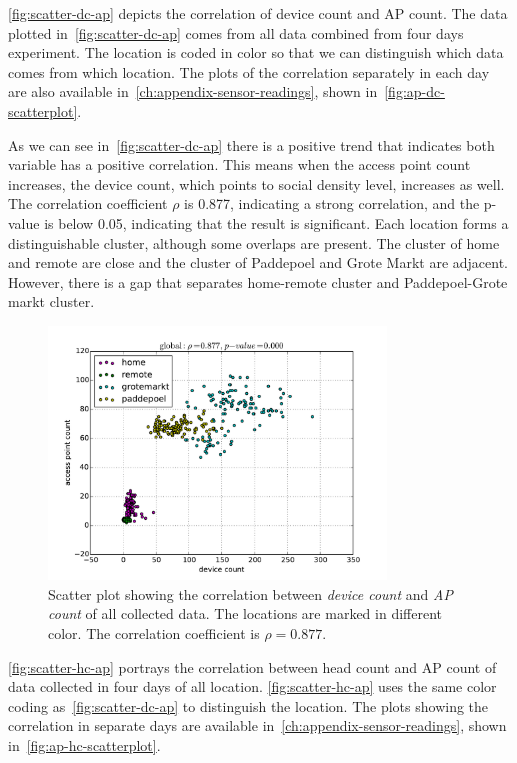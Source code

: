 	\autoref{fig:scatter-dc-ap} depicts the correlation of device count and \ac{AP} count. The data plotted in~\autoref{fig:scatter-dc-ap} comes from all data combined from four days experiment. The location is coded in color so that we can distinguish which data comes from which location. The plots of the correlation separately in each day are also available in~\autoref{ch:appendix-sensor-readings}, shown in~\autoref{fig:ap-dc-scatterplot}.
	
	As we can see in~\autoref{fig:scatter-dc-ap} there is a positive trend that indicates both variable has a positive correlation. This means when the access point count increases, the device count, which points to social density level, increases as well. The correlation coefficient $\rho$ is 0.877, indicating a strong correlation, and the p-value is below 0.05, indicating that the result is significant.
		Each location forms a distinguishable cluster, although some overlaps are present.
	The cluster of home and remote are close and the cluster of Paddepoel and Grote Markt are adjacent. However, there is a gap that separates home-remote cluster and Paddepoel-Grote markt cluster.

	\begin{figure}[h]
		\centering
		\includegraphics[width=0.8\textwidth]{./img/result/global-pr-vs-ap}
		\caption[Scatter plot of device and \ac{AP} count.]
		{Scatter plot showing the correlation between \textit{device count} and \textit{\ac{AP} count} of all collected data. The locations are marked in different color. The correlation coefficient is $\rho=0.877$.}
		\label{fig:scatter-dc-ap}
	\end{figure}

	\autoref{fig:scatter-hc-ap} portrays the correlation between head count and \ac{AP} count of data collected in four days of all location. \autoref{fig:scatter-hc-ap} uses the same color coding as~\autoref{fig:scatter-dc-ap} to distinguish the location. The plots showing the correlation in separate days are available in~\autoref{ch:appendix-sensor-readings}, shown in~\autoref{fig:ap-hc-scatterplot}.
	
